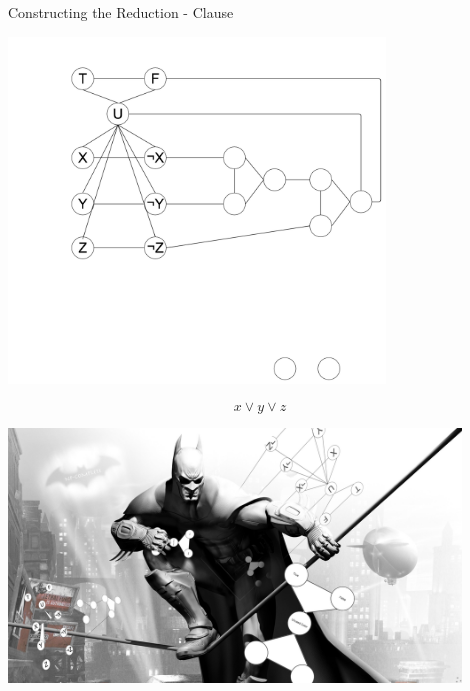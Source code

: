 \documentclass[bigger]{beamer}
\begin{document}
\begin{frame}[label=sec-13]{Constructing the Reduction - Clause}
\begin{center}
\includegraphics[width=10cm]{Comb2.png}
\end{center}

\[x\vee y \vee z\] 
\end{frame}

\begin{frame}[label=sec-14]{}
\begin{center}
\includegraphics[width=12cm]{bats.png}
\end{center}
\end{frame}
\end{document}
